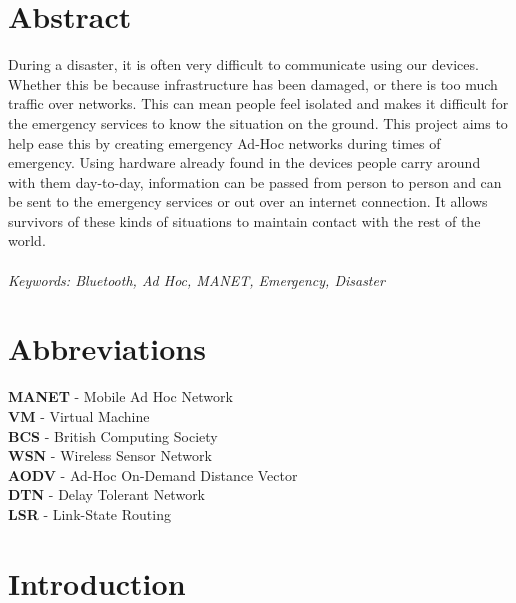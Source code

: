 \documentclass{report}
\begin{document}
\chapter*{Abstract}

During a disaster, it is often very difficult to communicate using our devices. Whether this be because 
infrastructure has been damaged, or there is too much traffic over networks. This can mean people feel 
isolated and makes it difficult for the emergency services to know the situation on the ground. This 
project aims to help ease this by creating emergency Ad-Hoc networks during times of emergency. Using 
hardware already found in the devices people carry around with them day-to-day, information can be 
passed from person to person and can be sent to the emergency services or out over an internet connection. 
It allows survivors of these kinds of situations to maintain contact with the rest of the world.  
\\
\\
\textit{Keywords: Bluetooth, Ad Hoc, MANET, Emergency, Disaster}



\chapter*{Abbreviations}

\textbf{MANET} - Mobile Ad Hoc Network\\
\textbf{VM} - Virtual Machine\\
\textbf{BCS} - British Computing Society\\
\textbf{WSN} - Wireless Sensor Network\\
\textbf{AODV} - Ad-Hoc On-Demand Distance Vector\\
\textbf{DTN} - Delay Tolerant Network\\
\textbf{LSR} - Link-State Routing\\




\chapter*{Introduction}
\end{document}
